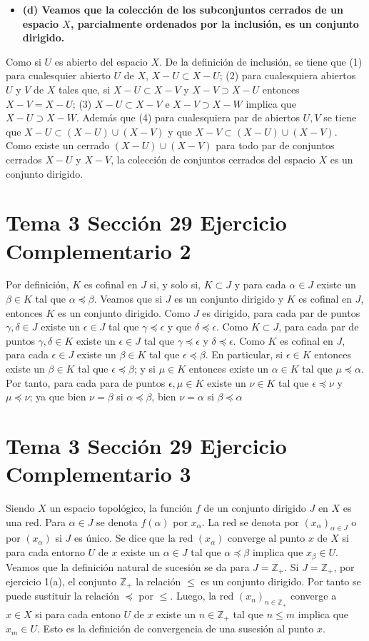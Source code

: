 \documentclass{article}
\begin{document}
\begin{itemize}
\item \bf (d) \rm Veamos que la colección de los subconjuntos cerrados de un espacio $X$, parcialmente ordenados por la inclusión, es un conjunto dirigido.
\end{itemize}
Como si $U$ es abierto del espacio $X$. De la definición de inclusión, se tiene que  
(1) para cualesquier abierto $U$ de $X$, $X-U\subset X-U$;
(2) para cualesquiera abiertos $U$ y $V$ de $X$ tales que, si $X-U\subset X-V$ y $X-V\supset X-U$ entonces $X-V=X-U$;
(3) $X-U\subset X-V$ e $X-V\supset X-W$ implica que $X-U\supset X-W$. Además que (4) para cualesquiera par de abiertos $U,V$ se tiene que  $X-U\subset (X-U)\cup (X-V)$ y que $X-V\subset (X-U)\cup (X-V)$. Como existe un cerrado $(X-U)\cup (X-V)$ para todo par de conjuntos cerrados $X-U$ y $X-V$, la colección de conjuntos cerrados del espacio $X$ es un conjunto dirigido.
\section{Tema 3 Sección 29 Ejercicio Complementario 2}
Por definición, $K$ es cofinal en $J$ si, y solo si, $K\subset J$ y para cada $\alpha\in J$ existe un $\beta\in K$ tal que $\alpha\preceq \beta$. Veamos que si $J$ es un conjunto dirigido y $K$ es cofinal en $J$, entonces $K$ es un conjunto dirigido.  Como $J$ es dirigido, para cada par de puntos $\gamma, \delta\in J$ existe un $\epsilon\in J$ tal que $\gamma\preceq\epsilon$ y que $\delta\preceq\epsilon$. Como $K\subset J$, para cada par de puntos $\gamma, \delta\in K$ existe un $\epsilon\in J$ tal que $\gamma\preceq\epsilon$ y $\delta\preceq\epsilon$. Como $K$ es cofinal en $J$, para cada $\epsilon \in J$ existe un $\beta\in K$ tal que $\epsilon\preceq \beta$. En particular, si $\epsilon \in K$ entonces existe un $\beta\in K$ tal que $\epsilon\preceq \beta$; y si $\mu \in K$ entonces existe un $\alpha \in K$ tal que $\mu\preceq \alpha$. Por tanto, para cada para de puntos $\epsilon ,\mu \in K$ existe un $\nu \in K$ tal que $\epsilon\preceq\nu $ y $\mu\preceq\nu$; ya que bien $\nu =\beta$ si $\alpha\preceq\beta$, bien $\nu =\alpha$ si $\beta\preceq\alpha$
\section{Tema 3 Sección 29 Ejercicio Complementario 3}
Siendo $X$ un espacio topológico, la función $f$ de un conjunto dirigido $J$ en $X$ es una red. Para $\alpha\in J$ se denota  $f(\alpha)$ por $x_\alpha$. La red se denota por $(x_\alpha)_{\alpha\in J}$ o por $(x_\alpha)$ si $J$ es único. Se dice que la red $(x_\alpha)$ converge al punto $x$ de $X$ si para cada entorno $U$ de $x$ existe un $\alpha \in J$ tal que $\alpha \preceq \beta$ implica que $x_\beta\in U$. Veamos que la definición natural de sucesión se da para $J=\mathbb{Z}_+$. Si $J=\mathbb{Z}_+$, por ejercicio 1(a), el conjunto $\mathbb{Z}_+$ la relación $\leq$ es un conjunto dirigido. Por tanto se puede sustituir la relación $\preceq$ por $\leq$. Luego, la red $(x_n)_{n\in \mathbb{Z}_+}$ converge a $x\in X$ si para cada entono $U$ de $x$ existe un $n \in \mathbb{Z}_+$ tal que $n \leq m$ implica que $x_m\in U$. Esto es la definición de convergencia de una susesión al punto $x$.
\end{document}
